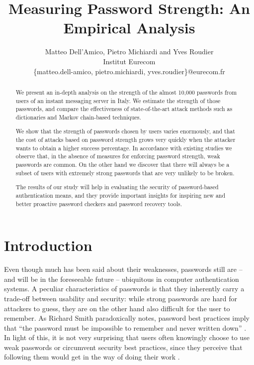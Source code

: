 \documentclass[a4paper,twocolumn]{article}
\begin{document}
\title{Measuring Password Strength: An Empirical Analysis}


\author{Matteo Dell'Amico, Pietro Michiardi and Yves Roudier\\
Institut Eurecom\\
\{matteo.dell-amico, pietro.michiardi, yves.roudier\}@eurecom.fr}
\maketitle
\begin{abstract}
We present an in-depth analysis on the strength of the almost 10,000
passwords from users of an instant messaging server in Italy. We estimate
the strength of those passwords, and compare the effectiveness of
state-of-the-art attack methods such as dictionaries and Markov chain-based
techniques.

We show that the strength of passwords chosen by users varies enormously,
and that the cost of attacks based on password strength grows very
quickly when the attacker wants to obtain a higher success percentage.
In accordance with existing studies we observe that, in the absence
of measures for enforcing password strength, weak passwords are common.
On the other hand we discover that there will always be a subset of
users with extremely strong passwords that are very unlikely to be
broken.

The results of our study will help in evaluating the security of password-based
authentication means, and they provide important insights for inspiring
new and better proactive password checkers and password recovery tools.
\end{abstract}



\section{Introduction}

Even though much has been said about their weaknesses, passwords still
are -- and will be in the foreseeable future -- ubiquitous in computer
authentication systems. A peculiar characteristics of passwords is
that they inherently carry a trade-off between usability and security:
while strong passwords are hard for attackers to guess, they are on
the other hand also difficult for the user to remember. As Richard
Smith paradoxically notes, password best practices imply that {}``the
password must be impossible to remember and never written down''
\cite{Smith2002Strong}. In light of this, it is not very surprising
that users often knowingly choose to use weak passwords or circumvent
security best practices, since they perceive that following them would
get in the way of doing their work \cite{Adams1999Users,Riley2006Password}. 
\end{document}
